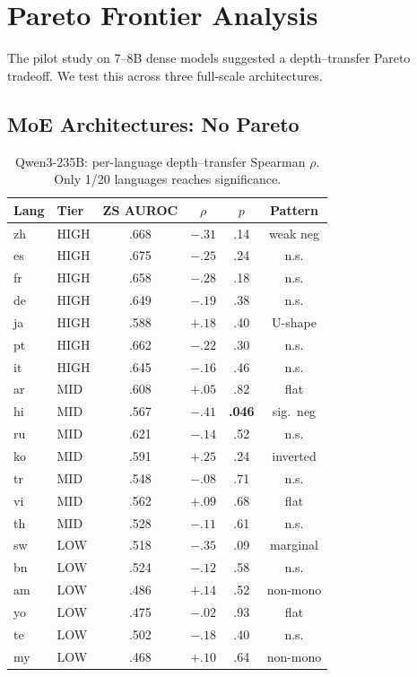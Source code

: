 \documentclass[11pt,a4paper]{article}
\begin{document}
\section{Pareto Frontier Analysis}
\label{sec:pareto}

The pilot study on 7--8B dense models suggested a depth--transfer Pareto tradeoff.
We test this across three full-scale architectures.

\subsection{MoE Architectures: No Pareto}

\begin{table}[t]
\centering
\small
\caption{Qwen3-235B: per-language depth--transfer Spearman $\rho$. Only 1/20 languages reaches significance.}
\label{tab:qwen_pareto}
\begin{tabular}{llcccc}
\toprule
Lang & Tier & ZS AUROC & $\rho$ & $p$ & Pattern \\
\midrule
zh & HIGH & .668 & $-.31$ & .14 & weak neg \\
es & HIGH & .675 & $-.25$ & .24 & n.s. \\
fr & HIGH & .658 & $-.28$ & .18 & n.s. \\
de & HIGH & .649 & $-.19$ & .38 & n.s. \\
ja & HIGH & .588 & $+.18$ & .40 & U-shape \\
pt & HIGH & .662 & $-.22$ & .30 & n.s. \\
it & HIGH & .645 & $-.16$ & .46 & n.s. \\
\midrule
ar & MID & .608 & $+.05$ & .82 & flat \\
hi & MID & .567 & $-.41$ & \textbf{.046} & sig.\ neg \\
ru & MID & .621 & $-.14$ & .52 & n.s. \\
ko & MID & .591 & $+.25$ & .24 & inverted \\
tr & MID & .548 & $-.08$ & .71 & n.s. \\
vi & MID & .562 & $+.09$ & .68 & flat \\
th & MID & .528 & $-.11$ & .61 & n.s. \\
\midrule
sw & LOW & .518 & $-.35$ & .09 & marginal \\
bn & LOW & .524 & $-.12$ & .58 & n.s. \\
am & LOW & .486 & $+.14$ & .52 & non-mono \\
yo & LOW & .475 & $-.02$ & .93 & flat \\
te & LOW & .502 & $-.18$ & .40 & n.s. \\
my & LOW & .468 & $+.10$ & .64 & non-mono \\
\bottomrule
\end{tabular}
\end{table}
\end{document}
